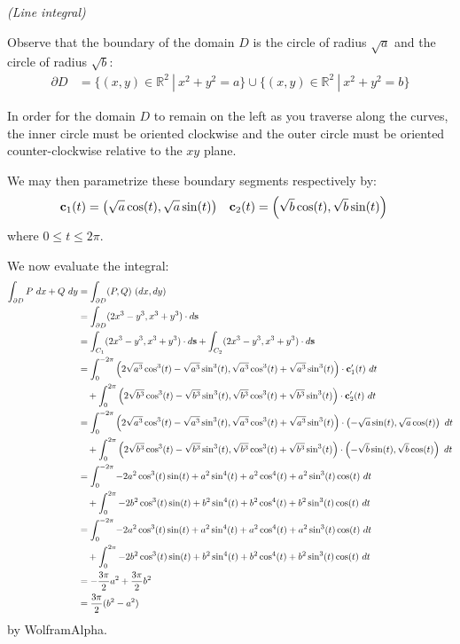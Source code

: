 \begin{solution}
    \textit{(Line integral)}
    
    Observe that the boundary of the domain \(D\) is the circle of radius \(\sqrt{a}\) and the circle of radius \(\sqrt{b}\):
    \begin{align}
        \partial D &= \{(x, y) \in \mathbb{R}^2 \ | \ x^2 + y^2 = a\} \cup \{(x, y) \in \mathbb{R}^2 \ | \ x^2 + y^2 = b\}
    \end{align}
    
    In order for the domain \(D\) to remain on the left as you traverse along the curves, the inner circle must be oriented clockwise and the outer circle must be oriented counter-clockwise relative to the \(xy\) plane.
    
    We may then parametrize these boundary segments respectively by:
    \begin{align}
        \vb{c}_1(t) &= \left(\sqrt{a}\cos(t), \sqrt{a}\sin(t)\right) & \vb{c}_2(t) &= \left(\sqrt{b}\cos(t), \sqrt{b}\sin(t)\right)
    \end{align}
    where \(0 \leq t \leq 2\pi\).
    
    We now evaluate the integral:
    \begin{align*}
        \int_{\partial D} P \ dx + Q \ dy &= \int_{\partial D} (P, Q) \ (dx, dy) \\ 
        &= \int_{\partial D} (2x^3 - y^3, x^3 + y^3) \cdot d\vb{s} \\ 
        &= \int_{C_1} (2x^3 - y^3, x^3 + y^3) \cdot d\vb{s} + \int_{C_2} (2x^3 - y^3, x^3 + y^3) \cdot d\vb{s} \\
        &= \int_0^{-2\pi} \left(2\sqrt{a^3}\cos^3(t) - \sqrt{a^3}\sin^3(t), \sqrt{a^3}\cos^3(t) + \sqrt{a^3}\sin^3(t)\right) \cdot \vb{c}'_1(t) \ dt \\
        &\quad + \int_0^{2\pi} \left(2\sqrt{b^3}\cos^3(t) - \sqrt{b^3}\sin^3(t), \sqrt{b^3}\cos^3(t) + \sqrt{b^3}\sin^3(t)\right) \cdot \vb{c}'_2(t) \ dt \\
        &= \int_0^{-2\pi} \left(2\sqrt{a^3}\cos^3(t) - \sqrt{a^3}\sin^3(t), \sqrt{a^3}\cos^3(t) + \sqrt{a^3}\sin^3(t)\right) \cdot \left(-\sqrt{a}\sin(t), \sqrt{a}\cos(t)\right) \ dt \\
        &\quad + \int_0^{2\pi} \left(2\sqrt{b^3}\cos^3(t) - \sqrt{b^3}\sin^3(t), \sqrt{b^3}\cos^3(t) + \sqrt{b^3}\sin^3(t)\right) \cdot \left(-\sqrt{b}\sin(t), \sqrt{b}\cos(t)\right) \ dt \\
        &= \int_0^{-2\pi} -2a^2\cos^3(t)\sin(t) + a^2\sin^4(t) + a^2\cos^4(t) + a^2\sin^3(t)\cos(t) \ dt \\
        &\quad + \int_0^{2\pi} -2b^2\cos^3(t)\sin(t) +b^2\sin^4(t) + b^2\cos^4(t) + b^2\sin^3(t)\cos(t) \ dt \\
        &= \int_0^{-2\pi} -2a^2\cos^3(t)\sin(t) + a^2\sin^4(t) + a^2\cos^4(t) + a^2\sin^3(t)\cos(t) \ dt \\
        &\quad + \int_0^{2\pi} -2b^2\cos^3(t)\sin(t) +b^2\sin^4(t) + b^2\cos^4(t) + b^2\sin^3(t)\cos(t) \ dt \\
        &= -\frac{3\pi}{2}a^2 + \frac{3\pi}{2}b^2 \\
        &= \frac{3\pi}{2}(b^2 - a^2)
    \end{align*}
    by WolframAlpha.
    

\end{solution}

